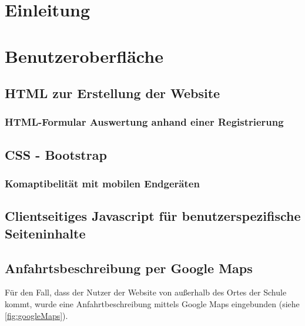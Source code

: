 \chapter{Einleitung}
\label{Einleitung}

\chapter{Benutzeroberfläche}
\label{Benutzeroberfläche}

\section{HTML zur Erstellung der Website}
\label{HTML zur Erstellung der Website}

\subsection{HTML-Formular Auswertung anhand einer Registrierung}
\label{HTML-Formular}

\section{CSS - Bootstrap}
\label{CSS - Bootstrap}

\subsection{Komaptibelität mit mobilen Endgeräten}
\label{Komaptibelität mit mobilen Endgeräten}

\section{Clientseitiges Javascript für benutzerspezifische Seiteninhalte}
\label{Clientseitiges Javascript}

\section{Anfahrtsbeschreibung per Google Maps}
\label{Anfahrtsbeschreibung per Google Maps}
Für den Fall, dass der Nutzer der Website von außerhalb des Ortes der Schule kommt, wurde eine Anfahrtbeschreibung mittels Google Maps eingebunden (siehe \vref{fig:googleMaps}).

